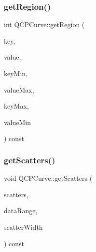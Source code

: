 \mbox{\label{class_q_c_p_curve_a77c89253397c4754b40d4bc8d3e789bf}} 
\subsubsection{\texorpdfstring{get\+Region()}{getRegion()}}
{\footnotesize\ttfamily int Q\+C\+P\+Curve\+::get\+Region (\begin{DoxyParamCaption}\item[{double}]{key,  }\item[{double}]{value,  }\item[{double}]{key\+Min,  }\item[{double}]{value\+Max,  }\item[{double}]{key\+Max,  }\item[{double}]{value\+Min }\end{DoxyParamCaption}) const\hspace{0.3cm}{\ttfamily [protected]}}

\mbox{\label{class_q_c_p_curve_a564c5fdc8409e3532b1322389a8434b8}} 
\subsubsection{\texorpdfstring{get\+Scatters()}{getScatters()}}
{\footnotesize\ttfamily void Q\+C\+P\+Curve\+::get\+Scatters (\begin{DoxyParamCaption}\item[{Q\+Vector$<$ Q\+PointF $>$ $\ast$}]{scatters,  }\item[{const \hyperlink{class_q_c_p_data_range}{Q\+C\+P\+Data\+Range} \&}]{data\+Range,  }\item[{double}]{scatter\+Width }\end{DoxyParamCaption}) const\hspace{0.3cm}{\ttfamily [protected]}}

\mbox{\label{class_q_c_p_curve_afc5367ef0369d7a88ebba6eacf55f14f}} 
